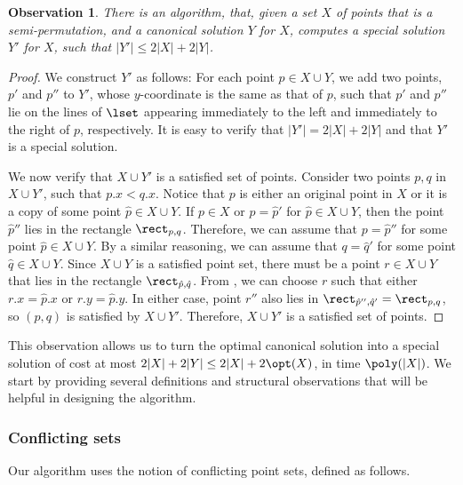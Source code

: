 \documentclass{toc}
\newtheorem{myobs}[theorem]{Observation}
\begin{document}
\begin{myobs}
        \label{obs: canonical to special} 
        There is an algorithm, that, given a set $X$ of points that is a semi-permutation, and a canonical solution $Y$ for $X$, computes a special solution $Y'$ for $X$, such that $|Y'| \leq 2 |X| + 2 |Y|$. 
\end{myobs}
\begin{proof}
We construct $Y'$ as follows: For each point $p \in X \cup Y$, we add two points, $p'$ and $p''$ to $Y'$, whose $y$-coordinate is the same as that of $p$, such that $p'$ and $p''$ lie on the lines of $\lset$ appearing immediately to the left and immediately to the right of $p$, respectively. %
                It is easy to verify that $|Y'|=2|X|+2|Y|$ and that $Y'$ is a special solution. 
        
        We now verify that $X \cup Y'$ is a satisfied set of points. 
        Consider two points $p,q$ in $X \cup Y'$, such that $p.x < q.x$. Notice that $p$ is either an original point in $X$ or it is a copy of some point $\hat p\in X \cup Y$. 
        If $p \in X$ or $p = \hat p'$ for $\hat p \in X \cup Y$, then the point $\hat p''$ lies in the rectangle $\rect_{p,q}$. Therefore, we can assume that $p=\hat p''$ for some point $\hat p\in X\cup Y$.
        By a similar reasoning, we can assume that $q=\hat q'$ for some point $\hat q\in X\cup Y$. Since $X\cup Y$ is a satisfied point set, there must be a point $r\in X\cup Y$ that lies in the rectangle $\rect_{\hat p,\hat q}$. From , we can choose $r$ such that either $r.x=\hat p.x$ or $r.y=\hat p.y$. In either case, point $r''$ also lies in $\rect_{\hat p'',\hat q'}=\rect_{p,q}$, so $(p,q)$ is satisfied by $X\cup Y'$. %
        Therefore, $X\cup Y'$ is a satisfied set of points. 
\end{proof}



This observation allows us to turn the optimal canonical solution into a special solution of cost at most $2|X|+2|Y|\leq 2|X|+2\opt(X)$, in time $\poly(|X|)$. 
We start by providing several definitions and structural observations that will be helpful in designing the algorithm.

\subsubsection{Conflicting sets} 

Our algorithm uses the notion of conflicting point sets, defined as follows.
\end{document}
